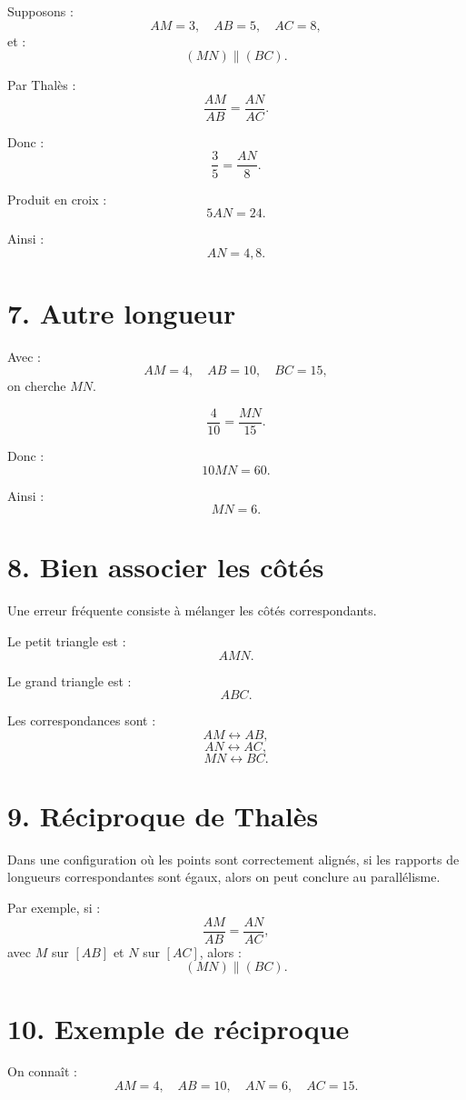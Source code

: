 Supposons :
\[
AM=3,
\quad
AB=5,
\quad
AC=8,
\]
et :
\[
(MN)\parallel(BC).
\]

Par Thalès :
\[
\dfrac{AM}{AB}=\dfrac{AN}{AC}.
\]

Donc :
\[
\dfrac35=\dfrac{AN}{8}.
\]

Produit en croix :
\[
5AN=24.
\]

Ainsi :
\[
\boxed{AN=4{,}8}.
\]

\section{7. Autre longueur}

Avec :
\[
AM=4,
\quad
AB=10,
\quad
BC=15,
\]
on cherche $MN$.

\[
\dfrac4{10}=\dfrac{MN}{15}.
\]

Donc :
\[
10MN=60.
\]

Ainsi :
\[
\boxed{MN=6}.
\]

\section{8. Bien associer les côtés}

Une erreur fréquente consiste à mélanger les côtés correspondants.

Le petit triangle est :
\[
AMN.
\]

Le grand triangle est :
\[
ABC.
\]

Les correspondances sont :
\[
AM\leftrightarrow AB,
\]
\[
AN\leftrightarrow AC,
\]
\[
MN\leftrightarrow BC.
\]

\section{9. Réciproque de Thalès}

\begin{propriete}
Dans une configuration où les points sont correctement alignés, si les rapports de longueurs correspondantes sont égaux, alors on peut conclure au parallélisme.
\end{propriete}

Par exemple, si :
\[
\dfrac{AM}{AB}
=
\dfrac{AN}{AC},
\]
avec $M$ sur $[AB]$ et $N$ sur $[AC]$, alors :
\[
(MN)\parallel(BC).
\]

\section{10. Exemple de réciproque}

On connaît :
\[
AM=4,
\quad
AB=10,
\quad
AN=6,
\quad
AC=15.
\]

